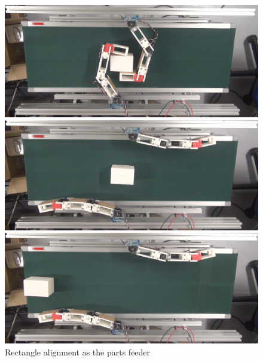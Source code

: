\documentclass[a4paper,twoside,12pt,papersize, dvipdfmx]{iirthesis}
\begin{document}
\begin{figure}[hb]
\begin{minipage}{0.49\hsize}
\subcaption{}
\end{minipage}\hfill
\begin{minipage}{0.49\hsize}
\includegraphics[width=0.98\hsize]{fig/4-manipulation-result/Rectangle/3-4.jpg}
\subcaption{}
\end{minipage}\hfill
\begin{minipage}{0.49\hsize}
\includegraphics[width=0.98\hsize]{fig/4-manipulation-result/Rectangle/3-5.jpg}
\subcaption{}
\end{minipage}\hfill
\begin{minipage}{0.49\hsize}
\includegraphics[width=0.98\hsize]{fig/4-manipulation-result/Rectangle/3-6.jpg}
\subcaption{}
\end{minipage}\hfill
\caption{Rectangle alignment as the parts feeder}\label{fig::result::rp}
\end{figure}
\end{document}
